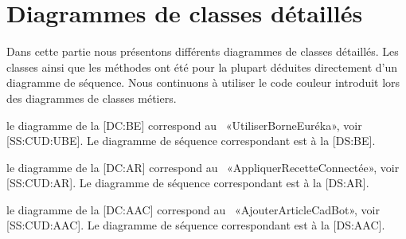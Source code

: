 \chapter{Diagrammes de classes détaillés}

Dans cette partie nous présentons différents diagrammes de classes détaillés.
Les classes ainsi que les méthodes ont été pour la plupart déduites directement d'un diagramme de séquence.
Nous continuons à utiliser le code couleur introduit lors des diagrammes de classes métiers.

\startitemize
\item le diagramme de la [DC:BE] correspond au \cu\ «UtiliserBorneEuréka», voir [SS:CUD:UBE].
Le diagramme de séquence correspondant est à la [DS:BE].

\item le diagramme de la [DC:AR] correspond au \cu\ «AppliquerRecetteConnectée», voir [SS:CUD:AR].
Le diagramme de séquence correspondant est à la [DS:AR].

\item le diagramme de la [DC:AAC] correspond au \cu\ «AjouterArticleCadBot», voir [SS:CUD:AAC].
Le diagramme de séquence correspondant est à la [DS:AAC].


\stopitemize

{}

{}

{}



